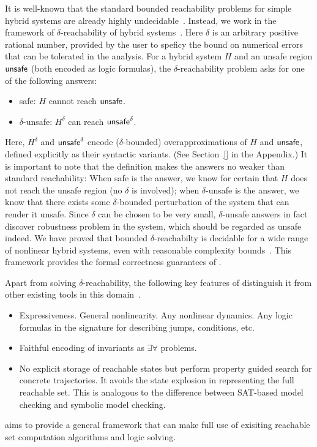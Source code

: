 It is well-known that the standard bounded reachability problems for
simple hybrid systems are already highly
undecidable~\cite{DBLP:conf/rex/AlurD91,DBLP:conf/hybrid/AlurCHH92}. 
Instead, we work in the framework of $\delta$-reachability of hybrid systems~\cite{}.
Here $\delta$ is an arbitrary positive rational number, provided by the user to 
speficy the bound on numerical errors that can be tolerated in the analysis. 
For a hybrid system $H$ and an unsafe region $\mathsf{unsafe}$ (both encoded as logic formulas), 
the $\delta$-reachability problem asks for one of the following answers:
\begin{itemize}
	\item {\sf safe}: $H$ cannot reach $\mathsf{unsafe}$.   
	\item {\sf $\delta$-unsafe}: $H^{\delta}$ can reach $\mathsf{unsafe}^{\delta}$. 
\end{itemize}
Here, $H^{\delta}$ and $\mathsf{unsafe}^{\delta}$ encode ($\delta$-bounded) overapproximations 
of $H$ and $\mathsf{unsafe}$, defined explicitly as their syntactic variants. (See Section~\ref{} in the Appendix.) 
It is important to note that the definition makes the answers no weaker than standard reachability:
When {\sf safe} is the answer, we know for certain that $H$ does not reach
the unsafe region (no $\delta$ is involved); when {\sf $\delta$-unsafe} is the answer,
we know that there exists some $\delta$-bounded perturbation of the system that can render it unsafe. 
Since $\delta$ can be chosen to be very small, {\sf$\delta$-unsafe} answers in fact 
discover robustness problem in the system, which should be regarded as unsafe indeed.
We have proved that bounded $\delta$-reachabilty is decidable for a wide range 
of nonlinear hybrid systems, even with reasonable complexity bounds~\cite{}. 
This framework provides the formal correctness guarantees of \dReach{}. 

Apart from solving $\delta$-reachability, the following key features of \dReach{}
distinguish it from other existing tools in this domain~\cite{DBLP:journals/jlp/FranzleTE10,
DBLP:conf/icons/HerdeEFT08,DBLP:conf/rtss/ChenAS12}. 
\begin{itemize}
\item Expressiveness. General nonlinearity. Any nonlinear dynamics. Any logic formulas in the signature for describing jumps, conditions, etc.
\item Faithful encoding of invariants as $\exists\forall$ problems.
\item No explicit storage of reachable states but perform property guided search for concrete trajectories.
It avoids the state explosion in representing the full reachable set. This is analogous to the difference between SAT-based
model checking and symbolic model checking.
\end{itemize}
\dReach{} aims to provide a general framework that can make full use of exisiting reachable set computation algorithms and logic solving.

